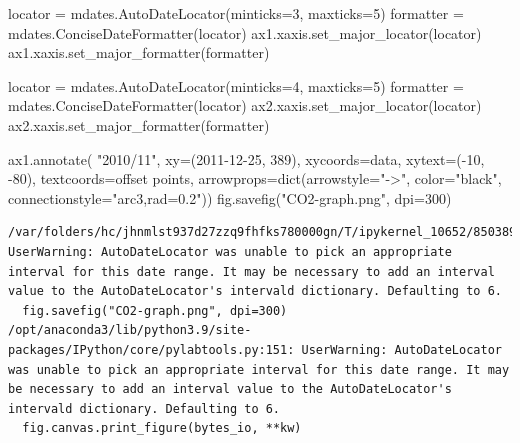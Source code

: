 \documentclass[
  letterpaper,
  DIV=11,
  numbers=noendperiod]{scrreprt}
\newenvironment{Shaded}{\begin{snugshade}}{\end{snugshade}}
\newcommand{\BuiltInTok}[1]{\textcolor[rgb]{0.00,0.23,0.31}{#1}}
\newcommand{\DecValTok}[1]{\textcolor[rgb]{0.68,0.00,0.00}{#1}}
\newcommand{\NormalTok}[1]{\textcolor[rgb]{0.00,0.23,0.31}{#1}}
\newcommand{\OperatorTok}[1]{\textcolor[rgb]{0.37,0.37,0.37}{#1}}
\newcommand{\StringTok}[1]{\textcolor[rgb]{0.13,0.47,0.30}{#1}}
\begin{document}
\begin{Shaded}
\begin{Highlighting}[]
\NormalTok{locator }\OperatorTok{=}\NormalTok{ mdates.AutoDateLocator(minticks}\OperatorTok{=}\DecValTok{3}\NormalTok{, maxticks}\OperatorTok{=}\DecValTok{5}\NormalTok{)}
\NormalTok{formatter }\OperatorTok{=}\NormalTok{ mdates.ConciseDateFormatter(locator)}
\NormalTok{ax1.xaxis.set\_major\_locator(locator)}
\NormalTok{ax1.xaxis.set\_major\_formatter(formatter)}

\NormalTok{locator }\OperatorTok{=}\NormalTok{ mdates.AutoDateLocator(minticks}\OperatorTok{=}\DecValTok{4}\NormalTok{, maxticks}\OperatorTok{=}\DecValTok{5}\NormalTok{)}
\NormalTok{formatter }\OperatorTok{=}\NormalTok{ mdates.ConciseDateFormatter(locator)}
\NormalTok{ax2.xaxis.set\_major\_locator(locator)}
\NormalTok{ax2.xaxis.set\_major\_formatter(formatter)}

\NormalTok{ax1.annotate(}
    \StringTok{"2010/11"}\NormalTok{,}
\NormalTok{    xy}\OperatorTok{=}\NormalTok{(}\StringTok{\textquotesingle{}2011{-}12{-}25\textquotesingle{}}\NormalTok{, }\DecValTok{389}\NormalTok{),  xycoords}\OperatorTok{=}\StringTok{\textquotesingle{}data\textquotesingle{}}\NormalTok{,}
\NormalTok{    xytext}\OperatorTok{=}\NormalTok{(}\OperatorTok{{-}}\DecValTok{10}\NormalTok{, }\OperatorTok{{-}}\DecValTok{80}\NormalTok{), textcoords}\OperatorTok{=}\StringTok{\textquotesingle{}offset points\textquotesingle{}}\NormalTok{,}
\NormalTok{    arrowprops}\OperatorTok{=}\BuiltInTok{dict}\NormalTok{(arrowstyle}\OperatorTok{=}\StringTok{"{-}\textgreater{}"}\NormalTok{,}
\NormalTok{                    color}\OperatorTok{=}\StringTok{"black"}\NormalTok{,}
\NormalTok{                    connectionstyle}\OperatorTok{=}\StringTok{"arc3,rad=0.2"}\NormalTok{))}
\NormalTok{fig.savefig(}\StringTok{"CO2{-}graph.png"}\NormalTok{, dpi}\OperatorTok{=}\DecValTok{300}\NormalTok{)}
\end{Highlighting}
\end{Shaded}

\begin{verbatim}
/var/folders/hc/jhnmlst937d27zzq9fhfks780000gn/T/ipykernel_10652/850389963.py:42: UserWarning: AutoDateLocator was unable to pick an appropriate interval for this date range. It may be necessary to add an interval value to the AutoDateLocator's intervald dictionary. Defaulting to 6.
  fig.savefig("CO2-graph.png", dpi=300)
/opt/anaconda3/lib/python3.9/site-packages/IPython/core/pylabtools.py:151: UserWarning: AutoDateLocator was unable to pick an appropriate interval for this date range. It may be necessary to add an interval value to the AutoDateLocator's intervald dictionary. Defaulting to 6.
  fig.canvas.print_figure(bytes_io, **kw)
\end{verbatim}
\end{document}
